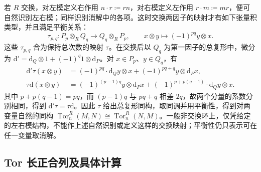 若 \(R\) 交换，对左模定义右作用 \(n\cdot r\coloneqq rn\)，对右模定义左作用 \(r\cdot m\coloneqq mr\)，便可自然识别左右模；同样识别消解中的各项。这时交换两因子的映射才有如下张量积类型，并且满足平衡关系：
\[
	\tau_{p,q}:P_p\otimes_RQ_q\longrightarrow Q_q\otimes_RP_p, \qquad x\otimes y\longmapsto(-1)^{pq}y\otimes x.
\]
这些 \(\tau_{p,q}\) 合为保持总次数的映射 \(\tau\)。在交换后以 \(Q_q\) 为第一因子的总复形中，微分为 \(\mathrm{d}'=\mathrm{d}_Q\otimes1+(-1)^q1\otimes\mathrm{d}_P\)。对 \(x\in P_p\)、\(y\in Q_q\)，有
\[
	\begin{aligned}
		\mathrm{d}'\tau(x\otimes y) &=(-1)^{pq}\cdot\mathrm{d}_Qy\otimes x +(-1)^{pq+q}y\otimes\mathrm{d}_Px,\\
		\tau\mathrm{d}(x\otimes y) &=(-1)^{(p-1)q}y\otimes\mathrm{d}_Px +(-1)^{p+p(q-1)}\cdot\mathrm{d}_Qy\otimes x.
	\end{aligned}
\]
其中 \(p+p(q-1)=pq\)，而 \((p-1)q\) 与 \(pq+q\) 相差 \(2q\)，故两个分量的系数分别相同，得到 \(\mathrm{d}'\tau=\tau\mathrm{d}\)。因此 \(\tau\) 给出总复形同构，取同调并用平衡性，得到对两变量自然的同构 \(\operatorname{Tor}_n^R(M,N)\cong\operatorname{Tor}_n^R(N,M)\)。一般非交换环上，仅凭给定的左右模结构，不能作上述自然识别或定义这样的交换映射；平衡性仍只表示可在任一变量取消解。

\subsection{Tor 长正合列及具体计算}
\label{b4:subsec:0803:03}

